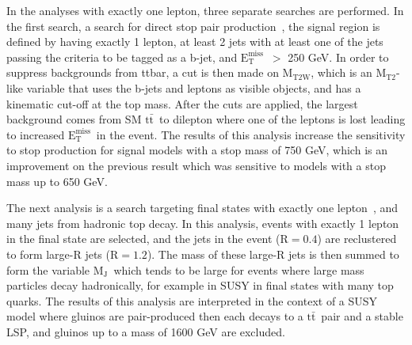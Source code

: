 \documentclass{article}
\newcommand{\MET}{${\mathrm{E_{T}^{miss}}}$}
\newcommand{\ttbar}{${\mathrm{t\bar{t}}}$}
\newcommand{\MJ}{$\mathrm{M_J}$}
\newcommand{\MTtwo}{$\mathrm{M_{T2}}$}
\begin{document}
In the analyses with exactly one lepton, three separate searches are performed.
In the first search, a search for direct stop pair production~\cite{1lstop2015}, the signal region is defined by having
exactly 1 lepton, at least 2 jets with at least one of the jets passing the criteria to be tagged as a b-jet, and \MET\ $>$ 250 GeV.
In order to suppress backgrounds from ttbar, a cut is then made on $\mathrm{M_{T2W}}$,
which is an \MTtwo-like variable that uses the b-jets and leptons as visible objects, and has a kinematic cut-off at the top mass.
After the cuts are applied, the largest background comes from SM \ttbar\ to dilepton where one of the leptons is lost leading to increased \MET\ in the event.
The results of this analysis increase the sensitivity to stop production for signal models with a stop mass of 750 GeV,
which is an improvement on the previous result which was sensitive to models with a stop mass up to 650 GeV.


The next analysis is a search targeting final states with exactly one lepton~\cite{1lmj2015}, and many jets from hadronic top decay.
In this analysis, events with exactly 1 lepton in the final state are selected,
and the jets in the event ($\mathrm{R=0.4}$) are reclustered to form large-R jets ($\mathrm{R=1.2}$).
The mass of these large-R jets is then summed to form the variable \MJ\
which tends to be large for events where large mass particles decay hadronically, for example in SUSY in final states with many top quarks.
The results of this analysis are interpreted in the context of a SUSY model where gluinos are pair-produced then each decays to a \ttbar\ pair and a stable LSP,
and gluinos up to a mass of 1600 GeV are excluded.
\end{document}
